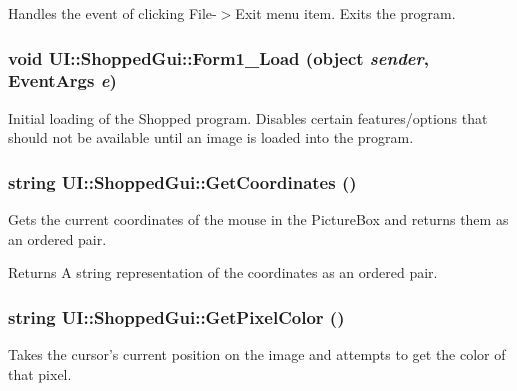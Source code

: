 \label{class_u_i_1_1_shopped_gui_a4c3239cc225d230bafb0cc53a9f49e2c}
Handles the event of clicking File-\/$>$Exit menu item. Exits the program. \hypertarget{class_u_i_1_1_shopped_gui_ad9bcb5a3a89de53a6ef580bd806fae26}{
\subsubsection[{Form1\_\-Load}]{\setlength{\rightskip}{0pt plus 5cm}void UI::ShoppedGui::Form1\_\-Load (object {\em sender}, \/  EventArgs {\em e})}}
\label{class_u_i_1_1_shopped_gui_ad9bcb5a3a89de53a6ef580bd806fae26}
Initial loading of the Shopped program. Disables certain features/options that should not be available until an image is loaded into the program. \hypertarget{class_u_i_1_1_shopped_gui_a2ec6c1eaa3745958b54c6c589eb55028}{
\subsubsection[{GetCoordinates}]{\setlength{\rightskip}{0pt plus 5cm}string UI::ShoppedGui::GetCoordinates ()}}
\label{class_u_i_1_1_shopped_gui_a2ec6c1eaa3745958b54c6c589eb55028}
Gets the current coordinates of the mouse in the PictureBox and returns them as an ordered pair.

\begin{DoxyReturn}{Returns}
A string representation of the coordinates as an ordered pair. 
\end{DoxyReturn}
\hypertarget{class_u_i_1_1_shopped_gui_ae231691f0dd77892c3e09d2c5ab033c3}{
\subsubsection[{GetPixelColor}]{\setlength{\rightskip}{0pt plus 5cm}string UI::ShoppedGui::GetPixelColor ()}}
\label{class_u_i_1_1_shopped_gui_ae231691f0dd77892c3e09d2c5ab033c3}
Takes the cursor's current position on the image and attempts to get the color of that pixel.

